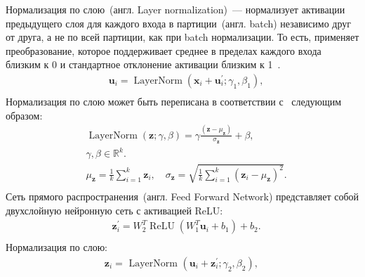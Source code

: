 Нормализация по слою~(англ. Layer normalization)~--- нормализует активации предыдущего слоя для каждого входа в партиции~(англ. batch) независимо друг от друга, а не по всей партиции, как при batch нормализации. То есть, применяет преобразование, которое поддерживает среднее в пределах каждого входа близким к 0 и стандартное отклонение активации близким к 1~\cite{ba2016layer}.
\begin{equation}
\begin{aligned}
&\mathbf{u}_i=\operatorname{LayerNorm}\left(\mathbf{x}_i+\mathbf{u}_i^{\prime} ; \gamma_1, \beta_1\right), \\
\end{aligned}
\end{equation}
Нормализация по слою может быть переписана в соответствии с~\cite{ba2016layer} следующим образом:
\begin{equation}
\begin{aligned}
& \operatorname{LayerNorm}(\mathbf{z} ; \gamma, \beta)=\gamma \frac{\left(\mathbf{z}-\mu_{\mathbf{z}}\right)}{\sigma_{\mathbf{z}}}+\beta, \\
& \gamma, \beta \in \mathbb{R}^k . \\
& \mu_{\mathbf{z}}=\frac{1}{k} \sum_{i=1}^k \mathbf{z}_i, \quad \sigma_{\mathbf{z}}=\sqrt{\frac{1}{k} \sum_{i=1}^k\left(\mathbf{z}_i-\mu_{\mathbf{z}}\right)^2} . \\
&
\end{aligned}
\end{equation}
Сеть прямого распространения~(англ. Feed Forward Network) представляет собой двухслойную нейронную сеть с активацией ReLU:
\begin{equation}
\begin{aligned}
& \mathbf{z}_i^{\prime}=W_2^T \operatorname{ReLU}\left(W_1^T \mathbf{u}_i + b_1\right) + b_2. \\
\end{aligned}
\end{equation}
Нормализация по слою:
\begin{equation}
\begin{aligned}
\mathbf{z}_i=\text { LayerNorm }\left(\mathbf{u}_i+\mathbf{z}_i^{\prime} ; \gamma_2, \beta_2\right) \text {, }
\end{aligned}
\end{equation}


